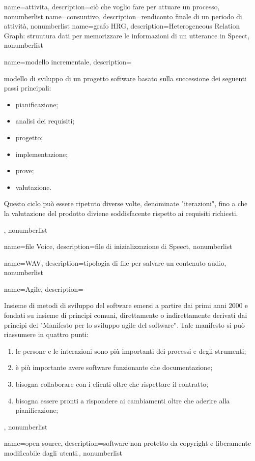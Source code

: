 {
name={attivita},
description={ciò che voglio fare per attuare un processo},
nonumberlist
}
{
name={consuntivo},
description={rendiconto finale di un periodo di attività},
nonumberlist
}
{
name={grafo HRG},
description={Heterogeneous Relation Graph: struutura dati per memorizzare le informazioni di un utterance in Speect},
nonumberlist
}
{
name={modello incrementale},
description={modello di sviluppo di un progetto software basato sulla successione dei seguenti passi principali:
\begin{itemize}
    \item pianificazione;
    \item analisi dei requisiti;
    \item progetto;
    \item implementazione;
    \item prove;
    \item valutazione.
\end{itemize}
Questo ciclo può essere ripetuto diverse volte, denominate "iterazioni", fino a che la valutazione del prodotto diviene soddisfacente rispetto ai requisiti richiesti.},
nonumberlist
}

{
name={file Voice},
description={file di inizializzazione di Speect},
nonumberlist
}

{
	name={WAV},
	description={tipologia di file per salvare un contenuto audio},
	nonumberlist
}
{
	name={Agile},
	description={Insieme di metodi di sviluppo del software emersi a partire dai
		primi anni 2000 e fondati su insieme di principi comuni, direttamente o
		indirettamente derivati dai principi del "Manifesto per lo sviluppo agile del
		software". Tale manifesto si può riassumere in quattro punti:
		\begin{enumerate}
			\item le persone e le interazioni sono più importanti dei processi e degli strumenti;
			\item è più importante avere software funzionante che documentazione;
			\item bisogna collaborare con i clienti oltre che rispettare il contratto;
			\item bisogna essere pronti a rispondere ai cambiamenti oltre che aderire alla pianificazione;
		\end{enumerate}
	},
	nonumberlist
}

{
	name={open source},
	description={software non protetto da copyright e liberamente modificabile dagli utenti.},
	nonumberlist
}